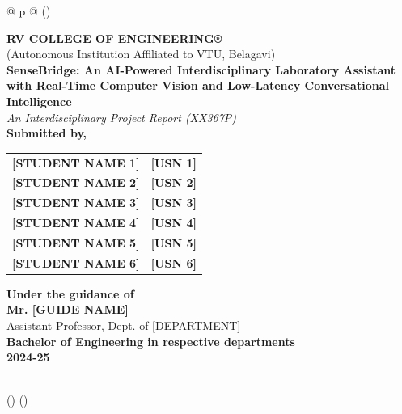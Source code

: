 \documentclass[12pt]{article}
\begin{document}
\begin{longtable}[]{@{} p{\textwidth} @{}}
\toprule()
\begin{minipage}[b]{\linewidth}
\centering
\vspace{1cm}
{\huge \textbf{RV COLLEGE OF ENGINEERING®}} \\
{\small (Autonomous Institution Affiliated to VTU, Belagavi)} \\
\vspace{1cm}
{\Large \textbf{SenseBridge: An AI-Powered Interdisciplinary Laboratory Assistant with Real-Time Computer Vision and Low-Latency Conversational Intelligence}} \\
\vspace{1cm}
\emph{An Interdisciplinary Project Report (XX367P)} \\
\vspace{1.5cm}
\textbf{Submitted by,} \\
\vspace{0.5cm}
\begin{tabular}{ll}
\textbf{[STUDENT NAME 1]} & \textbf{[USN 1]} \\
\textbf{[STUDENT NAME 2]} & \textbf{[USN 2]} \\
\textbf{[STUDENT NAME 3]} & \textbf{[USN 3]} \\
\textbf{[STUDENT NAME 4]} & \textbf{[USN 4]} \\
\textbf{[STUDENT NAME 5]} & \textbf{[USN 5]} \\
\textbf{[STUDENT NAME 6]} & \textbf{[USN 6]} \\
\end{tabular}

\vspace{1.5cm}
\textbf{Under the guidance of} \\
\textbf{Mr. [GUIDE NAME]} \\
Assistant Professor, Dept. of [DEPARTMENT] \\

\vfill
\textbf{Bachelor of Engineering in respective departments} \\
\textbf{2024-25}
\end{minipage} \\
\midrule()
\endhead
\bottomrule()
\end{longtable}

\newpage
\end{document}
